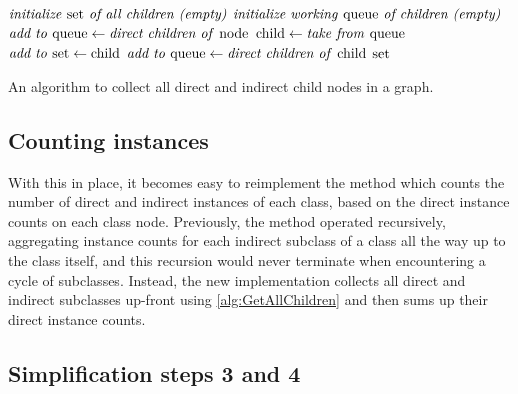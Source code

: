 \begin{algorithm}
  \begin{algorithmic}
    \State $\text{\textit{initialize \textup{set} of all children (empty)}}$
    \State $\text{\textit{initialize working \textup{queue} of children (empty)}}$
    \State $\text{\textit{add to \textup{queue}}} \gets \text{\textit{direct children of \textup{node}}}$
    \State $\textup{child} \gets \text{\textit{take from \textup{queue}}}$
    \State $\text{\textit{add to \textup{set}}} \gets \textup{child}$
    \State $\text{\textit{add to \textup{queue}}} \gets \text{\textit{direct children of \textup{child}}}$
    \EndIf
    \EndWhile
    \State \Return $\text{\textit{\textup{set}}}$
    \EndFunction
  \end{algorithmic}
  \caption{An algorithm to collect all direct and indirect child nodes in a graph.}
  \label{alg:GetAllChildren}
\end{algorithm}

\subsection{Counting instances}
\label{subsec:RDF2Graph+Wikidata:cyclic-graphs:count-instances}

With this in place,
it becomes easy to reimplement the method which counts the number of direct and indirect instances of each class,
based on the direct instance counts on each class node.
Previously, the method operated recursively,
aggregating instance counts for each indirect subclass of a class
all the way up to the class itself,
and this recursion would never terminate when encountering a cycle of subclasses.
Instead, the new implementation collects all direct and indirect subclasses up-front using \cref{alg:GetAllChildren}
and then sums up their direct instance counts.

\subsection{Simplification steps 3 and 4}
\label{subsec:RDF2Graph+Wikidata:cyclic-graphs:simplify-step-3+4}

